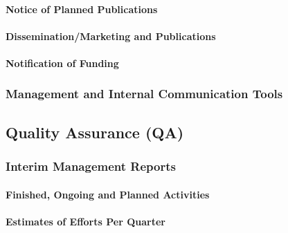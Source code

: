 \documentclass[
  11pt,
]{article}
\begin{document}
\hypertarget{notice-of-planned-publications}{%
\paragraph{Notice of Planned
Publications}\label{notice-of-planned-publications}}

\hypertarget{disseminationmarketing-and-publications}{%
\paragraph{Dissemination/Marketing and
Publications}\label{disseminationmarketing-and-publications}}

\hypertarget{notification-of-funding}{%
\paragraph{Notification of Funding}\label{notification-of-funding}}

\hypertarget{management-and-internal-communication-tools}{%
\subsubsection{Management and Internal Communication
Tools}\label{management-and-internal-communication-tools}}

\hypertarget{quality-assurance-qa}{%
\subsection{Quality Assurance (QA)}\label{quality-assurance-qa}}

\hypertarget{interim-management-reports}{%
\subsubsection{Interim Management
Reports}\label{interim-management-reports}}

\hypertarget{finished-ongoing-and-planned-activities}{%
\paragraph{Finished, Ongoing and Planned
Activities}\label{finished-ongoing-and-planned-activities}}

\hypertarget{estimates-of-efforts-per-quarter}{%
\paragraph{Estimates of Efforts Per
Quarter}\label{estimates-of-efforts-per-quarter}}
\end{document}
